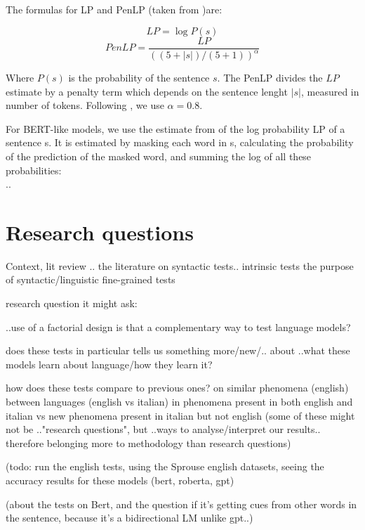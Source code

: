 The formulas for LP and PenLP (taken from \citep{lau2020furiously})are:

\begin{displaymath}
	LP = \log P(s)
\end{displaymath}
\begin{displaymath}
	PenLP = \frac{LP}{((5+|s|) \big/ (5+1))^\alpha}
\end{displaymath}

Where \( P(s) \) is the probability of the sentence \( s \). The PenLP divides the \( LP \) estimate by a penalty term which depends on the sentence lenght \( |s| \), measured in number of tokens. Following \citet{lau2020furiously}, we use \( \alpha=0.8 \).

For BERT-like models, we use the estimate from \citet{lau2020furiously} of the log probability LP of a sentence s. It is estimated by masking each word in s, calculating the probability of the prediction of the masked word, and summing the log of all these probabilities:
\\ ..


\section{Research questions}

Context, lit review ..
the literature on syntactic tests.. intrinsic tests
the purpose of syntactic/linguistic fine-grained tests

research question it might ask:

..use of a factorial design
is that a complementary way to test language models?

does these tests in particular tells us something more/new/.. about ..what these models learn about language/how they learn it?

how does these tests compare to previous ones? on similar phenomena (english)
between languages (english vs italian)
in phenomena present in both english and italian vs new phenomena present in italian but not english
(some of these might not be .."research questions", but ..ways to analyse/interpret our results.. therefore belonging more to methodology than research questions)

(todo: run the english tests, using the Sprouse english datasets, seeing the accuracy results for these models (bert, roberta, gpt)

(about the tests on Bert, and the question if it's getting cues from other words in the sentence, because it's a bidirectional LM unlike gpt..)

